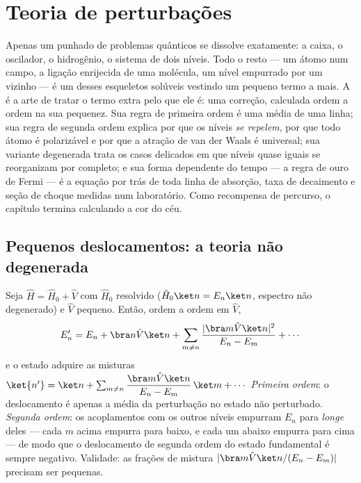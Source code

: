 \chapter{Teoria de perturbações}\label{ch:b3:perturbation-theory}

Apenas um punhado de problemas quânticos se dissolve exatamente: a
caixa, o oscilador, o hidrogênio, o sistema de dois níveis. Todo o
resto --- um átomo num campo, a ligação enrijecida de uma molécula, um
nível empurrado por um vizinho --- é um desses esqueletos solúveis
vestindo um pequeno termo a mais. A  é a arte de
tratar o termo extra pelo que ele é: uma correção, calculada ordem a
ordem na sua pequenez. Sua regra de primeira ordem é uma média de uma
linha; sua regra de segunda ordem explica por que os níveis
\emph{se repelem}, por que todo átomo é polarizável e por que a atração
de van der Waals é universal; sua variante degenerada trata os casos
delicados em que níveis quase iguais se reorganizam por completo; e sua
forma dependente do tempo --- a regra de ouro de Fermi --- é a equação
por trás de toda linha de absorção, taxa de decaimento e seção de
choque medidas num laboratório. Como recompensa de percurso, o capítulo
termina calculando a cor do céu.

\section{Pequenos deslocamentos: a teoria não degenerada}

\begin{theorem}\label{thm:b3:perturbation-theory:corrections}
Seja $\hat H = \hat H_0 + \hat V$ com $\hat H_0$ resolvido
($\hat H_0\ket n = E_n\ket n$, espectro não degenerado) e $\hat V$
pequeno. Então, ordem a ordem em $\hat V$,
\[
E_n' = E_n + \bra n\hat V\ket n
 + \sum_{m \neq n}\frac{|\bra m\hat V\ket n|^2}{E_n - E_m}
 + \cdots
\]
e o estado adquire as misturas $\ket{n'} = \ket n + \sum_{m\neq
n}\dfrac{\bra m\hat V\ket n}{E_n - E_m}\,\ket m + \cdots$
\emph{Primeira ordem}: o deslocamento é apenas a média da perturbação
no estado não perturbado. \emph{Segunda ordem}: os acoplamentos com os
outros níveis empurram $E_n$ para \emph{longe} deles --- cada $m$ acima
empurra para baixo, e cada um abaixo empurra para cima --- de modo que o
deslocamento de segunda ordem do estado fundamental é sempre negativo.
Validade: as frações de mistura $|\bra m\hat V\ket n/(E_n - E_m)|$
precisam ser pequenas.
\end{theorem}

